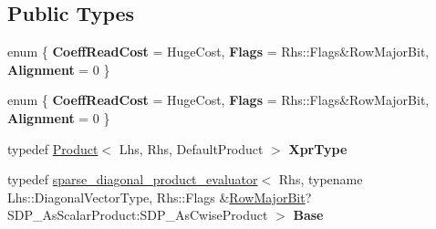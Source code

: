 \subsection*{Public Types}
\begin{DoxyCompactItemize}
\item 
\mbox{\label{struct_eigen_1_1internal_1_1product__evaluator_3_01_product_3_01_lhs_00_01_rhs_00_01_default_pro850b56c5eb8e297547f40d125e705127_ae481bc2221d0018390927d490ac23401}} 
enum \{ {\bfseries Coeff\+Read\+Cost} = Huge\+Cost, 
{\bfseries Flags} = Rhs\+:\+:Flags\&Row\+Major\+Bit, 
{\bfseries Alignment} = 0
 \}
\item 
\mbox{\label{struct_eigen_1_1internal_1_1product__evaluator_3_01_product_3_01_lhs_00_01_rhs_00_01_default_pro850b56c5eb8e297547f40d125e705127_ab646e7bdb3061b18c11970e289ddc7b5}} 
enum \{ {\bfseries Coeff\+Read\+Cost} = Huge\+Cost, 
{\bfseries Flags} = Rhs\+:\+:Flags\&Row\+Major\+Bit, 
{\bfseries Alignment} = 0
 \}
\item 
\mbox{\label{struct_eigen_1_1internal_1_1product__evaluator_3_01_product_3_01_lhs_00_01_rhs_00_01_default_pro850b56c5eb8e297547f40d125e705127_a1c266fa49360eaf2366037c1fc512b85}} 
typedef \hyperlink{group___core___module_class_eigen_1_1_product}{Product}$<$ Lhs, Rhs, Default\+Product $>$ {\bfseries Xpr\+Type}
\item 
\mbox{\label{struct_eigen_1_1internal_1_1product__evaluator_3_01_product_3_01_lhs_00_01_rhs_00_01_default_pro850b56c5eb8e297547f40d125e705127_af5caa47759bf7be1acf10ae00d06e6df}} 
typedef \hyperlink{struct_eigen_1_1internal_1_1sparse__diagonal__product__evaluator}{sparse\+\_\+diagonal\+\_\+product\+\_\+evaluator}$<$ Rhs, typename Lhs\+::\+Diagonal\+Vector\+Type, Rhs\+::\+Flags \&\hyperlink{group__flags_gae4f56c2a60bbe4bd2e44c5b19cbe8762}{Row\+Major\+Bit}?S\+D\+P\+\_\+\+As\+Scalar\+Product\+:\+S\+D\+P\+\_\+\+As\+Cwise\+Product $>$ {\bfseries Base}

\end{DoxyCompactItemize}
